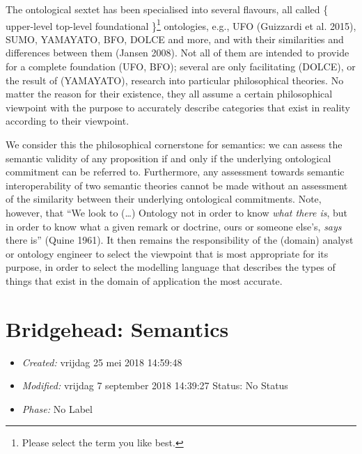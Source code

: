 \documentclass[a4paper,11pt,oneside,oldfontcommands]{memoir}
\theoremstyle{definition}
\theoremstyle{break}		%
\numberwithin{equation}{chapter}
\numberwithin{figure}{chapter}
\begin{document}
The ontological sextet has been specialised into several flavours, all
called \{ upper-level \textbar{} top-level \textbar{} foundational
\}\footnote{Please select the term you like best.} ontologies, e.g., UFO
(Guizzardi et al. 2015), SUMO, YAMAYATO, BFO, DOLCE and more, and with
their similarities and differences between them (Jansen 2008). Not all
of them are intended to provide for a complete foundation (UFO, BFO);
several are only facilitating (DOLCE), or the result of (YAMAYATO),
research into particular philosophical theories. No matter the reason
for their existence, they all assume a certain philosophical viewpoint
with the purpose to accurately describe categories that exist in reality
according to their viewpoint.

We consider this the philosophical cornerstone for semantics: we can
assess the semantic validity of any proposition if and only if the
underlying ontological commitment can be referred to. Furthermore, any
assessment towards semantic interoperability of two semantic theories
cannot be made without an assessment of the similarity between their
underlying ontological commitments. Note, however, that ``We look to
(\ldots{}) Ontology not in order to know \emph{what there is}, but in
order to know what a given remark or doctrine, ours or someone else's,
\emph{says} there is'' (Quine 1961). It then remains the responsibility
of the (domain) analyst or ontology engineer to select the viewpoint
that is most appropriate for its purpose, in order to select the
modelling language that describes the types of things that exist in the
domain of application the most accurate.

\hypertarget{bridgehead-semantics}{%
\chapter{Bridgehead: Semantics}\label{bridgehead-semantics}}

\begin{itemize}
\tightlist
\item
  \emph{Created:} vrijdag 25 mei 2018 14:59:48
\item
  \emph{Modified:} vrijdag 7 september 2018 14:39:27 Status: No Status
\item
  \emph{Phase:} No Label
\end{itemize}
\end{document}
